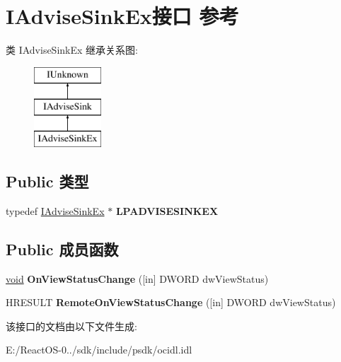 \hypertarget{interface_i_advise_sink_ex}{}\section{I\+Advise\+Sink\+Ex接口 参考}
\label{interface_i_advise_sink_ex}
类 I\+Advise\+Sink\+Ex 继承关系图\+:\begin{figure}[H]
\begin{center}
\leavevmode
\includegraphics[height=3.000000cm]{interface_i_advise_sink_ex}
\end{center}
\end{figure}
\subsection*{Public 类型}
\begin{DoxyCompactItemize}
\item 
\mbox{\label{interface_i_advise_sink_ex_aab8fbaaccdbe1fafff3a27b69deac4fd}} 
typedef \hyperlink{interface_i_advise_sink_ex}{I\+Advise\+Sink\+Ex} $\ast$ {\bfseries L\+P\+A\+D\+V\+I\+S\+E\+S\+I\+N\+K\+EX}
\end{DoxyCompactItemize}
\subsection*{Public 成员函数}
\begin{DoxyCompactItemize}
\item 
\mbox{\label{interface_i_advise_sink_ex_adf73aa597335f15e17bbc32d6b3443ce}} 
\hyperlink{interfacevoid}{void} {\bfseries On\+View\+Status\+Change} (\mbox{[}in\mbox{]} D\+W\+O\+RD dw\+View\+Status)
\item 
\mbox{\label{interface_i_advise_sink_ex_a8650f1471dacc5703ce85b32fa3ac9f4}} 
H\+R\+E\+S\+U\+LT {\bfseries Remote\+On\+View\+Status\+Change} (\mbox{[}in\mbox{]} D\+W\+O\+RD dw\+View\+Status)
\end{DoxyCompactItemize}


该接口的文档由以下文件生成\+:\begin{DoxyCompactItemize}
\item 
E\+:/\+React\+O\+S-\/0../sdk/include/psdk/ocidl.\+idl\end{DoxyCompactItemize}
